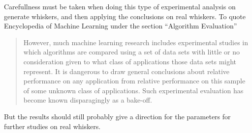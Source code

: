 
Carefullness must be taken when doing this type of experimental analysis on generate whiskers, and then
applying the conclusions on real whiskers. 
To quote Encyclopedia of Machine Learning\cite{EncyclopediaMachineLearning} under the section ``Algorithm Evaluation''
\begin{quote}
    However, much machine learning
    research includes experimental studies in which algorithms 
    are compared using a set of data sets with little
    or no consideration given to what class of applications
    those data sets might represent. It is dangerous to draw
    general conclusions about relative performance on any
    application from relative performance on this sample
    of some unknown class of applications. Such experimental
    evaluation has become known disparagingly as a bake-off.
\end{quote}

But the results should still probably give a direction for the parameters for further studies on real whiskers.




%








%
%
%
%
%
%
%

%
% 
%
%
%
%
%






